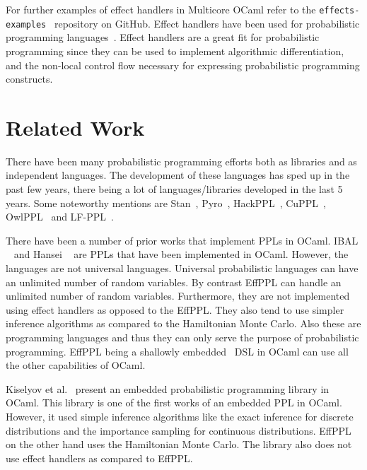 \documentclass[a4paper,11pt]{article}
\theoremstyle{mytheor}
\begin{document}
 For further examples of effect handlers in Multicore OCaml refer to the \texttt{effects-examples}~\cite{ocaml-multicore} repository on GitHub. Effect handlers have been used for probabilistic programming languages~\cite{hack,pyro}. Effect handlers are a great fit for probabilistic programming since they can be used to implement algorithmic differentiation, and the non-local control flow necessary for expressing probabilistic programming constructs. 





\section{Related Work}


There have been many probabilistic programming efforts both as libraries and as independent languages. The development of these languages has sped up in the past few years, there being a lot of languages/libraries developed in the last 5 years. Some noteworthy mentions are Stan~\cite{stan}, Pyro~\cite{pyro}, HackPPL~\cite{hack}, CuPPL~\cite{collins2020probabilistic}, OwlPPL~\cite{roy2020probabilistic} and LF-PPL~\cite{zhou2019lfppl}. 

There have been a number of prior works that implement PPLs in OCaml. IBAL ~\cite{IBAL} and Hansei ~\cite{Hansei} are PPLs that have been implemented in OCaml. However, the languages are not universal languages. Universal probabilistic languages can have an unlimited number of random variables. By contrast EffPPL can handle an unlimited number of random variables. Furthermore, they are not implemented using effect handlers as opposed to the EffPPL. They also tend to use simpler inference algorithms as compared to the Hamiltonian Monte Carlo. Also these are programming languages and thus they can only serve the purpose of probabilistic programming. EffPPL being a shallowly embedded~\cite{dsl} DSL in OCaml can use all the other capabilities of OCaml.

Kiselyov et al.~\cite{Kiselyov2009Embedded} present an embedded probabilistic programming library in OCaml. This library is one of the first works of an embedded PPL in OCaml. However, it used simple inference algorithms like the exact inference for discrete distributions and the importance sampling for continuous distributions. EffPPL on the other hand uses the Hamiltonian Monte Carlo. The library also does not use effect handlers as compared to EffPPL. 
\end{document}
